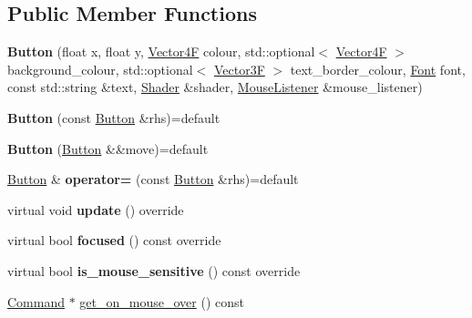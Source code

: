 \subsection*{Public Member Functions}
\begin{DoxyCompactItemize}
\item 
\mbox{\label{class_button_a228b18e1d494f3d443d9a42ad16d5568}} 
{\bfseries Button} (float x, float y, \mbox{\hyperlink{class_vector4}{Vector4F}} colour, std\+::optional$<$ \mbox{\hyperlink{class_vector4}{Vector4F}} $>$ background\+\_\+colour, std\+::optional$<$ \mbox{\hyperlink{class_vector3}{Vector3F}} $>$ text\+\_\+border\+\_\+colour, \mbox{\hyperlink{class_font}{Font}} font, const std\+::string \&text, \mbox{\hyperlink{class_shader}{Shader}} \&shader, \mbox{\hyperlink{class_mouse_listener}{Mouse\+Listener}} \&mouse\+\_\+listener)
\item 
\mbox{\label{class_button_a0e6f3b5eaf1fa5516d3108642bf0352d}} 
{\bfseries Button} (const \mbox{\hyperlink{class_button}{Button}} \&rhs)=default
\item 
\mbox{\label{class_button_a37df30404c7b99d1eaddc71d92416b04}} 
{\bfseries Button} (\mbox{\hyperlink{class_button}{Button}} \&\&move)=default
\item 
\mbox{\label{class_button_a5f79d527c2668a28cacd28a2b5fb3761}} 
\mbox{\hyperlink{class_button}{Button}} \& {\bfseries operator=} (const \mbox{\hyperlink{class_button}{Button}} \&rhs)=default
\item 
\mbox{\label{class_button_abda97f1ae8e081da3dbd0b77a27cad9d}} 
virtual void {\bfseries update} () override
\item 
\mbox{\label{class_button_a2c1b0adeb2920b394fe4f38354ae6604}} 
virtual bool {\bfseries focused} () const override
\item 
\mbox{\label{class_button_aa2b16ae30fe74f215aa79c699bbf8510}} 
virtual bool {\bfseries is\+\_\+mouse\+\_\+sensitive} () const override
\item 
\mbox{\hyperlink{class_command}{Command}} $\ast$ \mbox{\hyperlink{class_button_a3f9b964049bde58b8f39170ce8b6fa2e}{get\+\_\+on\+\_\+mouse\+\_\+over}} () const
\item 

\end{DoxyCompactItemize}
